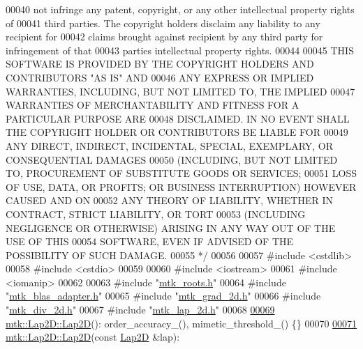 \begin{DoxyCode}
00040 \textcolor{comment}{not infringe any patent, copyright, or any other intellectual property rights of}
00041 \textcolor{comment}{third parties. The copyright holders disclaim any liability to any recipient for}
00042 \textcolor{comment}{claims brought against recipient by any third party for infringement of that}
00043 \textcolor{comment}{parties intellectual property rights.}
00044 \textcolor{comment}{}
00045 \textcolor{comment}{THIS SOFTWARE IS PROVIDED BY THE COPYRIGHT HOLDERS AND CONTRIBUTORS "AS IS" AND}
00046 \textcolor{comment}{ANY EXPRESS OR IMPLIED WARRANTIES, INCLUDING, BUT NOT LIMITED TO, THE IMPLIED}
00047 \textcolor{comment}{WARRANTIES OF MERCHANTABILITY AND FITNESS FOR A PARTICULAR PURPOSE ARE}
00048 \textcolor{comment}{DISCLAIMED. IN NO EVENT SHALL THE COPYRIGHT HOLDER OR CONTRIBUTORS BE LIABLE FOR}
00049 \textcolor{comment}{ANY DIRECT, INDIRECT, INCIDENTAL, SPECIAL, EXEMPLARY, OR CONSEQUENTIAL DAMAGES}
00050 \textcolor{comment}{(INCLUDING, BUT NOT LIMITED TO, PROCUREMENT OF SUBSTITUTE GOODS OR SERVICES;}
00051 \textcolor{comment}{LOSS OF USE, DATA, OR PROFITS; OR BUSINESS INTERRUPTION) HOWEVER CAUSED AND ON}
00052 \textcolor{comment}{ANY THEORY OF LIABILITY, WHETHER IN CONTRACT, STRICT LIABILITY, OR TORT}
00053 \textcolor{comment}{(INCLUDING NEGLIGENCE OR OTHERWISE) ARISING IN ANY WAY OUT OF THE USE OF THIS}
00054 \textcolor{comment}{SOFTWARE, EVEN IF ADVISED OF THE POSSIBILITY OF SUCH DAMAGE.}
00055 \textcolor{comment}{*/}
00056 
00057 \textcolor{preprocessor}{#include <cstdlib>}
00058 \textcolor{preprocessor}{#include <cstdio>}
00059 
00060 \textcolor{preprocessor}{#include <iostream>}
00061 \textcolor{preprocessor}{#include <iomanip>}
00062 
00063 \textcolor{preprocessor}{#include "\hyperlink{mtk__roots_8h}{mtk\_roots.h}"}
00064 \textcolor{preprocessor}{#include "\hyperlink{mtk__blas__adapter_8h}{mtk\_blas\_adapter.h}"}
00065 \textcolor{preprocessor}{#include "\hyperlink{mtk__grad__2d_8h}{mtk\_grad\_2d.h}"}
00066 \textcolor{preprocessor}{#include "\hyperlink{mtk__div__2d_8h}{mtk\_div\_2d.h}"}
00067 \textcolor{preprocessor}{#include "\hyperlink{mtk__lap__2d_8h}{mtk\_lap\_2d.h}"}
00068 
\hypertarget{mtk__lap__2d_8cc_source_l00069}{}\hyperlink{classmtk_1_1Lap2D_ada4370fb8d7726e70a3257e3841c6d1f}{00069} \hyperlink{classmtk_1_1Lap2D_ada4370fb8d7726e70a3257e3841c6d1f}{mtk::Lap2D::Lap2D}(): order\_accuracy\_(), mimetic\_threshold\_() \{\}
00070 
\hypertarget{mtk__lap__2d_8cc_source_l00071}{}\hyperlink{classmtk_1_1Lap2D_acf62bf6a1c041e4b02f06346054d7af2}{00071} \hyperlink{classmtk_1_1Lap2D_ada4370fb8d7726e70a3257e3841c6d1f}{mtk::Lap2D::Lap2D}(\textcolor{keyword}{const} \hyperlink{classmtk_1_1Lap2D}{Lap2D} &lap):

\end{DoxyCode}
